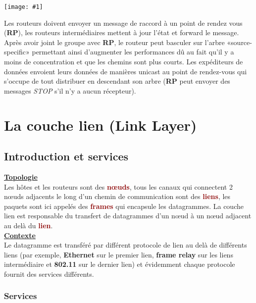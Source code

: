 \documentclass{article}
\newcommand{\dred}[1]{\textcolor{darkred}{\textbf{#1}}}
\newcommand{\imgR}[2]{\begin{center}\texttt{[image: \#1]}\end{center}}
\newcommand{\neuSP}{n\oe ud }
\newcommand{\neus}{n\oe uds}
\newcommand{\neuSPs}{n\oe uds }
\begin{document}
\imgR{CN_104.png}{100}

Les routeurs doivent envoyer un message de raccord à un point de rendez vous (\textbf{RP}), les routeurs 
intermédiaires mettent à jour l'état et forward le message. Après avoir joint le groupe avec \textbf{RP}, le 
routeur peut basculer sur l'arbre «source-specific» permettant ainsi d'augmenter les performances dû au fait 
qu'il y a moins de concentration et que les chemins sont plus courts. Les expéditeurs de données envoient leurs
données de manières unicast au point de rendez-vous qui s'occupe de tout distribuer en descendant son arbre 
(\textbf{RP} peut envoyer des messages \textit{STOP} s'il n'y a aucun récepteur). \\

\hbox{\raisebox{0.4em}{\vrule depth 0.4pt height 0.4pt width 10cm}}

\section{La couche lien (Link Layer)}

\subsection{Introduction et services}

\noindent\textbf{\underline{Topologie}} \\

Les hôtes et les routeurs sont des \dred{\neus}, tous les canaux qui connectent 2 \neuSPs adjacents le long 
d'un chemin de communication sont des \dred{liens}, les paquets sont ici appelés des \dred{frames} qui encapsule
les datagrammes. La couche lien est responsable du transfert de datagrammes d'un \neuSP à un \neuSP adjacent au 
delà du \dred{lien}. \\

\noindent\textbf{\underline{Contexte}} \\

Le datagramme est transféré par différent protocole de lien au delà de différents liens (par exemple, 
\textbf{Ethernet} sur le premier lien, \textbf{frame relay} sur les liens intermédiaire et \textbf{802.11} sur le
dernier lien) et évidemment chaque protocole fournit des services différents.

\subsubsection{Services}
\end{document}
